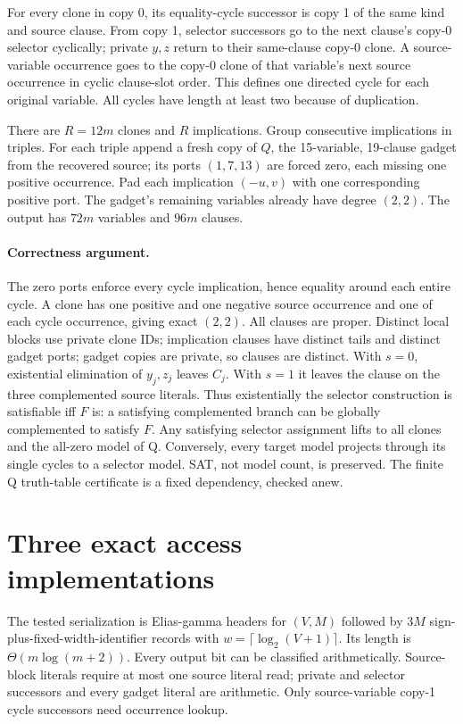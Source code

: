 \documentclass[11pt]{article}
\begin{document}
For every clone in copy 0, its equality-cycle successor is copy 1 of the
same kind and source clause. From copy 1, selector successors go to the
next clause's copy-0 selector cyclically; private $y,z$ return to their
same-clause copy-0 clone. A source-variable occurrence goes to the
copy-0 clone of that variable's next source occurrence in cyclic
clause-slot order. This defines one directed cycle for each original variable.
All cycles have length at least two because of duplication.

There are $R=12m$ clones and $R$ implications.
Group consecutive implications in triples. For each triple append a fresh
copy of $Q$, the 15-variable, 19-clause gadget from the recovered source;
its ports $(1,7,13)$ are forced zero, each missing one positive occurrence.
Pad each implication $(-u,v)$ with one corresponding positive port.
The gadget's remaining variables already have degree $(2,2)$.
The output has $72m$ variables and $96m$ clauses.

\paragraph{Correctness argument.}
The zero ports enforce every cycle implication, hence equality around
each entire cycle. A clone has one positive and one negative source
occurrence and one of each cycle occurrence, giving exact $(2,2)$.
All clauses are proper. Distinct local blocks use private clone IDs;
implication clauses have distinct tails and distinct gadget ports;
gadget copies are private, so clauses are distinct.
With $s=0$, existential elimination of $y_j,z_j$ leaves $C_j$.
With $s=1$ it leaves the clause on the three complemented source literals.
Thus existentially the selector construction is satisfiable iff $F$ is:
a satisfying complemented branch can be globally complemented to satisfy $F$.
Any satisfying selector assignment lifts to all clones and the all-zero
model of Q. Conversely, every target model projects through its single
cycles to a selector model. SAT, not model count, is preserved.
The finite Q truth-table certificate is a fixed dependency, checked anew.

\section{Three exact access implementations}
The tested serialization is Elias-gamma headers for $(V,M)$ followed by
$3M$ sign-plus-fixed-width-identifier records with
$w=\lceil\log_2(V+1)\rceil$. Its length is $\Theta(m\log(m+2))$.
Every output bit can be classified arithmetically.
Source-block literals require at most one source literal read;
private and selector successors and every gadget literal are arithmetic.
Only source-variable copy-1 cycle successors need occurrence lookup.
\end{document}

